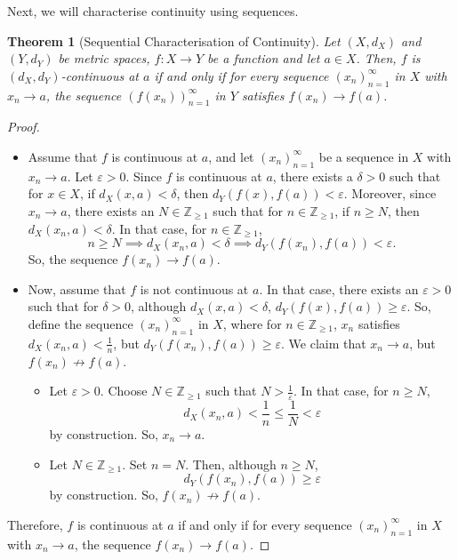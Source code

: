 \documentclass[a4paper, openany]{memoir}
\theoremstyle{definition}
\theoremstyle{plain}
\newtheorem{theorem}[definition]{Theorem}
\begin{document}
Next, we will characterise continuity using sequences.
\begin{theorem}[Sequential Characterisation of Continuity]
Let $(X, d_X)$ and $(Y, d_Y)$ be metric spaces, $f: X \to Y$ be a function and let $a \in X$. Then, $f$ is $(d_X, d_Y)$-continuous at $a$ if and only if for every sequence $(x_n)_{n=1}^{\infty}$ in $X$ with $x_n \to a$, the sequence $(f(x_n))_{n=1}^{\infty}$ in $Y$ satisfies $f(x_n) \to f(a)$.
\end{theorem}
\begin{proof}
\hspace*{0pt}
\begin{itemize}
    \item Assume that $f$ is continuous at $a$, and let $(x_n)_{n=1}^{\infty}$ be a sequence in $X$ with $x_n \to a$. Let $\varepsilon > 0$. Since $f$ is continuous at $a$, there exists a $\delta > 0$ such that for $x \in X$, if $d_X(x, a) < \delta$, then $d_Y(f(x), f(a)) < \varepsilon$. Moreover, since $x_n \to a$, there exists an $N \in \mathbb{Z}_{\geqslant 1}$ such that for $n \in \mathbb{Z}_{\geqslant 1}$, if $n \geqslant N$, then $d_X(x_n, a) < \delta$. In that case, for $n \in \mathbb{Z}_{\geqslant 1}$,
    \[n \geqslant N \implies d_X(x_n, a) < \delta \implies d_Y(f(x_n), f(a)) < \varepsilon.\]
    So, the sequence $f(x_n) \to f(a)$.
    
    \item Now, assume that $f$ is not continuous at $a$. In that case, there exists an $\varepsilon > 0$ such that for $\delta > 0$, although $d_X(x, a) < \delta$, $d_Y(f(x), f(a)) \geqslant \varepsilon$. So, define the sequence $(x_n)_{n=1}^{\infty}$ in $X$, where for $n \in \mathbb{Z}_{\geqslant 1}$, $x_n$ satisfies $d_X(x_n, a) < \frac{1}{n}$, but $d_Y(f(x_n), f(a)) \geqslant \varepsilon$. We claim that $x_n \to a$, but $f(x_n) \not\to f(a)$.
    \begin{itemize}
        \item Let $\varepsilon > 0$. Choose $N \in \mathbb{Z}_{\geqslant 1}$ such that $N > \frac{1}{\varepsilon}$. In that case, for $n \geqslant N$,
        \[d_X(x_n, a) < \frac{1}{n} \leqslant \frac{1}{N} < \varepsilon\]
        by construction. So, $x_n \to a$.
        
        \item Let $N \in \mathbb{Z}_{\geqslant 1}$. Set $n = N$. Then, although $n \geqslant N$, 
        \[d_Y(f(x_n), f(a)) \geqslant \varepsilon\]
        by construction. So, $f(x_n) \not\to f(a)$.
    \end{itemize}
\end{itemize}
Therefore, $f$ is continuous at $a$ if and only if for every sequence $(x_n)_{n=1}^{\infty}$ in $X$ with $x_n \to a$, the sequence $f(x_n) \to f(a)$.
\end{proof}
\end{document}
